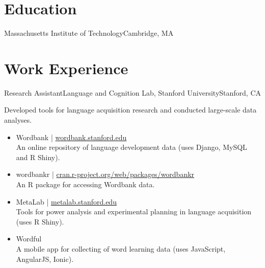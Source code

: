 \documentclass[11pt,letter]{moderncv}
\begin{document}
\makecvtitle

\vspace*{-2\baselineskip}

\section{Education}

{Massachusetts Institute of Technology}{Cambridge, MA}{}{}


\vspace*{0.25em}

\section{Work Experience}


{Research Assistant}{Language and Cognition Lab, Stanford University}{Stanford, CA}{}{
%
Developed tools for language acquisition research and conducted large-scale data analyses.
\begin{itemize}
\item Wordbank | \url{wordbank.stanford.edu}\\An online repository of language development data (uses Django, MySQL and R Shiny).
\item wordbankr | \url{cran.r-project.org/web/packages/wordbankr}\\An R package for accessing Wordbank data.
\item MetaLab | \url{metalab.stanford.edu}\\Tools for power analysis and experimental planning in language acquisition (uses R Shiny).
\item Wordful\\A mobile app for collecting of word learning data (uses JavaScript, AngularJS, Ionic).
\end{itemize}
%
}
\vspace*{0.2em}
\end{document}
